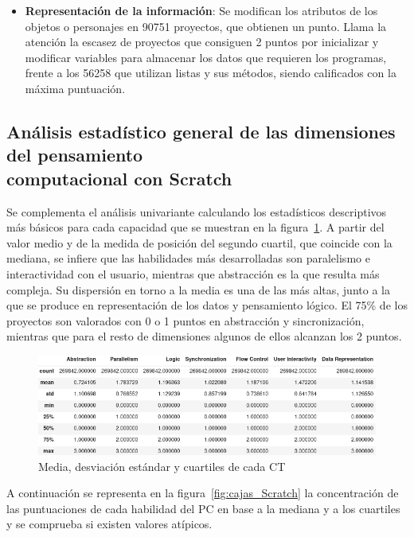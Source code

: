 \documentclass[a4paper, 12pt]{book}
\begin{document}
\begin{itemize}
    \item \textbf{Representación de la información}: Se modifican los atributos de los objetos o personajes en 90751 proyectos, que obtienen un punto. Llama la atención la escasez de proyectos que consiguen 2 puntos por inicializar y modificar variables para almacenar los datos que requieren los programas, frente a los 56258 que utilizan listas y sus métodos, siendo calificados con la máxima puntuación.     
\end{itemize}

\subsection{Análisis estadístico general de las dimensiones del pensamiento \\computacional con Scratch}
\label{subsec:estad_pc_Scratch}

Se complementa el análisis univariante calculando los estadísticos descriptivos más básicos para cada capacidad que se muestran en la figura~\ref{fig:describe_Scratch}. A partir del valor medio y de la medida de posición del segundo cuartil, que coincide con la mediana, se infiere que las habilidades más desarrolladas son paralelismo e interactividad con el usuario, mientras que abstracción es la que resulta más compleja. Su dispersión en torno a la media es una de las más altas, junto a la que se produce en representación de los datos y pensamiento lógico. El 75\% de los proyectos son valorados con 0 o 1 puntos en abstracción y sincronización, mientras que para el resto de dimensiones algunos de ellos alcanzan los 2 puntos. 

\begin{figure}[H]
    \centering
    \includegraphics[width=1\textwidth]{img/describe_Scratch.png}
    \caption{Media, desviación estándar y cuartiles de cada CT}
    \label{fig:describe_Scratch}
\end{figure}

A continuación se representa en la figura~\ref{fig:cajas_Scratch} la concentración de las puntuaciones de cada habilidad del PC en base a la mediana y a los cuartiles y se comprueba si existen valores atípicos.
\end{document}
